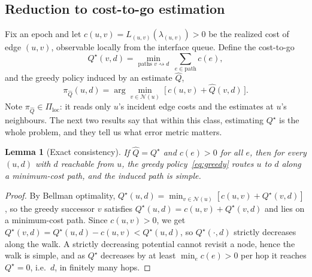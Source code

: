 \documentclass[conference]{IEEEtran}
\newtheorem{lemma}{Lemma}
\begin{document}
\subsection{Reduction to cost-to-go estimation}
Fix an epoch and let $c(u,v)=L_{(u,v)}(\lambda_{(u,v)})>0$ be the realized cost of edge $(u,v)$, observable locally from the interface queue. Define the cost-to-go
\begin{equation}
Q^\star(v,d)=\min_{\text{paths } v\rightsquigarrow d}\ \sum_{e\in\text{path}} c(e),
\label{eq:ctg}
\end{equation}
and the greedy policy induced by an estimate $\hat{Q}$,
\begin{equation}
\pi_{\hat{Q}}(u,d)=\arg\min_{v\in\mathcal{N}(u)}\ \big[\,c(u,v)+\hat{Q}(v,d)\,\big].
\label{eq:greedy}
\end{equation}
Note $\pi_{\hat Q}\in\Pi_{\mathrm{loc}}$: it reads only $u$'s incident edge costs and the estimates at $u$'s neighbours. The next two results say that within this class, estimating $Q^\star$ is the whole problem, and they tell us what error metric matters.

\begin{lemma}[Exact consistency]\label{lem:exact}
If $\hat{Q}=Q^\star$ and $c(e)>0$ for all $e$, then for every $(u,d)$ with $d$ reachable from $u$, the greedy policy~\eqref{eq:greedy} routes $u$ to $d$ along a minimum-cost path, and the induced path is simple.
\end{lemma}
\begin{proof}
By Bellman optimality, $Q^\star(u,d)=\min_{v\in\mathcal{N}(u)}[c(u,v)+Q^\star(v,d)]$, so the greedy successor $v$ satisfies $Q^\star(u,d)=c(u,v)+Q^\star(v,d)$ and lies on a minimum-cost path. Since $c(u,v)>0$, we get $Q^\star(v,d)=Q^\star(u,d)-c(u,v)<Q^\star(u,d)$, so $Q^\star(\cdot,d)$ strictly decreases along the walk. A strictly decreasing potential cannot revisit a node, hence the walk is simple, and as $Q^\star$ decreases by at least $\min_e c(e)>0$ per hop it reaches $Q^\star=0$, i.e.\ $d$, in finitely many hops.
\end{proof}
\end{document}
